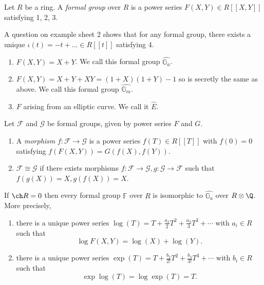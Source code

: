\documentclass[a4paper]{article}
\theoremstyle{definition}
\theoremstyle{theorem}
\begin{document}
\begin{definition}
  Let \(R\) be a ring. A \emph{formal group} over \(R\) is a power series \(F(X, Y) \in R[[X, Y]]\) satisfying 1, 2, 3.
\end{definition}

A question on example sheet 2 shows that for any formal group, there exists a unique \(\iota(t) = -t + \dots \in R[[t]]\) satisfying 4.

\begin{eg}\leavevmode
  \begin{enumerate}
  \item \(F(X, Y) = X + Y\). We call this formal group \(\hat{\mathbb G_a}\).
  \item \(F(X, Y) = X + Y + XY = (1 + X)(1 + Y) - 1\) so is secretly the same as above. We call this formal group \(\hat{\mathbb G_m}\).
  \item \(F\) arising from an elliptic curve. We call it \(\hat E\).
  \end{enumerate}
\end{eg}

\begin{definition}
  Let \(\mathcal F\) and \(\mathcal G\) be formal groups, given by power series \(F\) and \(G\).
  \begin{enumerate}
  \item A \emph{morphism} \(f: \mathcal F \to \mathcal G\) is a power series \(f(T) \in R[[T]]\) with \(f(0) = 0\) satisfying \(f(F(X, Y)) = G(f(X), f(Y))\).
  \item \(\mathcal F \cong \mathcal G\) if there exists morphisms \(f: \mathcal F \to \mathcal G, g: \mathcal G \to \mathcal F\) such that \(f(g(X)) = X, g(f(X)) = X\).
  \end{enumerate}
\end{definition}

\begin{theorem}
  If \(\ch R = 0\) then every formal group \(\mathbb F\) over \(R\) is isomorphic to \(\hat{\mathbb G_a}\) over \(R \otimes \Q\). More precisely,
  \begin{enumerate}
  \item there is a unique power series \(\log(T) = T + \frac{a_2}{2} T^2 + \frac{a_3}{3}T^3 + \cdots\) with \(a_i \in R\) such that
    \[
      \log F(X, Y) = \log(X) + \log(Y).
      \tag{\ast}
    \]
  \item there is a unique power series \(\exp(T) = T + \frac{b_2}{2!} T^2 + \frac{b_3}{3!} T^3 + \cdots\) with \(b_i \in R\) such that
    \[
      \exp \log (T) = \log \exp (T) = T.
    \]
  \end{enumerate}
\end{theorem}
\end{document}
